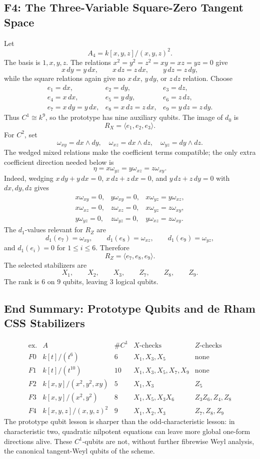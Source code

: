 \subsection{F4: The Three-Variable Square-Zero Tangent Space}
Let
\[
  A_4=k[x,y,z]/(x,y,z)^2.
\]
The basis is \(1,x,y,z\).  The relations \(x^2=y^2=z^2=xy=xz=yz=0\) give
\[
  x\,dy=y\,dx,\qquad x\,dz=z\,dx,\qquad y\,dz=z\,dy,
\]
while the square relations again give no \(x\,dx\), \(y\,dy\), or \(z\,dz\)
relation.  Choose
\[
\begin{array}{lll}
e_1=dx,& e_2=dy,& e_3=dz,\\
e_4=x\,dx,& e_5=y\,dy,& e_6=z\,dz,\\
e_7=x\,dy=y\,dx,& e_8=x\,dz=z\,dx,& e_9=y\,dz=z\,dy.
\end{array}
\]
Thus \(C^1\cong k^9\), so the prototype has nine auxiliary qubits.  The image
of \(d_0\) is
\[
  R_X=\langle e_1,e_2,e_3\rangle.
\]
For \(C^2\), set
\[
  \omega_{xy}=dx\wedge dy,\quad \omega_{xz}=dx\wedge dz,\quad
  \omega_{yz}=dy\wedge dz.
\]
The wedged mixed relations make the coefficient terms compatible; the only
extra coefficient direction needed below is
\[
  \eta=x\omega_{yz}=y\omega_{xz}=z\omega_{xy}.
\]
Indeed, wedging \(x\,dy+y\,dx=0\), \(x\,dz+z\,dx=0\), and
\(y\,dz+z\,dy=0\) with \(dx,dy,dz\) gives
\[
\begin{array}{lll}
x\omega_{xy}=0,&y\omega_{xy}=0,&x\omega_{yz}=y\omega_{xz},\\
x\omega_{xz}=0,&z\omega_{xz}=0,&x\omega_{yz}=z\omega_{xy},\\
y\omega_{yz}=0,&z\omega_{yz}=0,&y\omega_{xz}=z\omega_{xy}.
\end{array}
\]
The \(d_1\)-values relevant for \(R_Z\) are
\[
  d_1(e_7)=\omega_{xy},\qquad
  d_1(e_8)=\omega_{xz},\qquad
  d_1(e_9)=\omega_{yz},
\]
and \(d_1(e_i)=0\) for \(1\le i\le6\).  Therefore
\[
  R_Z=\langle e_7,e_8,e_9\rangle.
\]
The selected stabilizers are
\[
  X_1,\qquad X_2,\qquad X_3,\qquad Z_7,\qquad Z_8,\qquad Z_9.
\]
The rank is \(6\) on \(9\) qubits, leaving \(3\) logical qubits.
\subsection{End Summary: Prototype Qubits and de Rham CSS Stabilizers}
{\scriptsize
\[
\begin{array}{c|c|c|c|c}
\text{ex.} & A & \#C^1 & X\text{-checks} & Z\text{-checks}\\ \hline
F0&k[t]/(t^6)&6&X_1,X_3,X_5&\text{none}\\
F1&k[t]/(t^{10})&10&X_1,X_3,X_5,X_7,X_9&\text{none}\\
F2&k[x,y]/(x^2,y^2,xy)&5&X_1,X_3&Z_5\\
F3&k[x,y]/(x^2,y^2)&8&X_1,X_5,X_3X_6&Z_3Z_6,Z_4,Z_8\\
F4&k[x,y,z]/(x,y,z)^2&9&X_1,X_2,X_3&Z_7,Z_8,Z_9
\end{array}
\]
}
The prototype qubit lesson is sharper than the odd-characteristic lesson: in
characteristic two, quadratic nilpotent equations can leave more global
one-form directions alive.  These \(C^1\)-qubits are not, without further
fibrewise Weyl analysis, the canonical tangent-Weyl qubits of the scheme.
